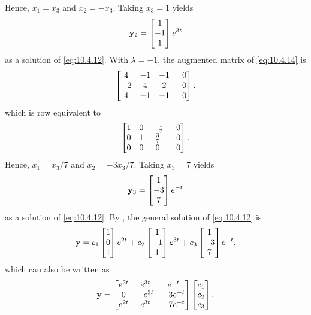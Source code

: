 \begin{alistSolution}
\[\]
Hence,  $x_1=x_3$ and $x_2=-x_3$. Taking $x_3=1$ yields
\[
\mathbf{y}_2=\begin{bmatrix}1\\-1\\1\end{bmatrix}e^{3t}
\]
as a solution of  \eqref{eq:10.4.12}.  With $\lambda=-1$, the augmented
matrix of  \eqref{eq:10.4.14} is
\[
\amatrix{4&-1&-1\\-2&4&2\\4&-1&-1}{0\\0\\0},
\]
which is row equivalent to
\[
\amatrix{1&0&-\frac{1}{7}\\0&1&\frac{3}{7}\\0&0&0}{0\\0\\0}.
\]
Hence, $x_1=x_3/7$ and $x_2=-3x_3/7$.  Taking $x_3=7$ yields
\[
\mathbf{y}_3=\begin{bmatrix}1\\-3\\7\end{bmatrix}e^{-t}
\]
as a solution of  \eqref{eq:10.4.12}. By ,
 the general solution of  \eqref{eq:10.4.12} is
\[
\mathbf{y}=c_1\begin{bmatrix}1\\0\\1\end{bmatrix}e^{2t}
+c_2\begin{bmatrix}1\\-1\\1\end{bmatrix}
e^{3t}+c_3
\begin{bmatrix}1\\-3\\7\end{bmatrix}e^{-t},
\]
which can also be written as
\begin{equation}\label{eq:10.4.15}
\mathbf{y}=\begin{bmatrix}
e^{2t}&e^{3t}&e^{-t}\\
0&-e^{3t}&-3e^{-t}\\
e^{2t}&e^{3t}&\phantom{-}7e^{-t}
\end{bmatrix}\begin{bmatrix}c_1\\c_2\\c_3\end{bmatrix}.
\end{equation}


\end{alistSolution}
